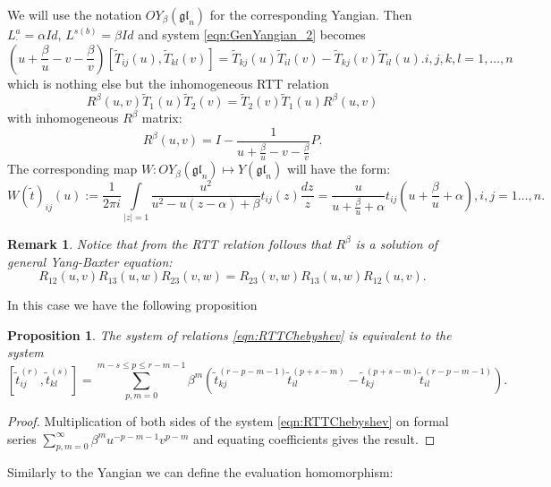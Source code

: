 \documentclass[10pt]{article}%
\numberwithin{equation}{section}
\newtheorem{prop}[thm]{Proposition}
\newtheorem{rem}[thm]{Remark}
\newcommand{\gl}{{\mathfrak{gl}}}
\begin{document}
We will use the notation $OY_{\beta}(\gl_n)$ for the corresponding Yangian.
Then $L_{\cdot}^{a}=\alpha Id$, $L^{s(b)}=\beta Id$ and system \eqref{eqn:GenYangian_2} becomes
\[
\left(u+\frac{\beta}{u}-v-\frac{\beta}{v}\right)[\tilde{T}_{ij}(u),\tilde{T}_{kl}(v)]=\tilde{T}_{kj}(u)\tilde{T}_{il}(v)-\tilde{T}_{kj}(v)\tilde{T}_{il}(u).i,j,k,l=1,\ldots,n
\]
which is nothing else but the inhomogeneous RTT relation 
\begin{equation}\label{eqn:RTTChebyshev}
R^{\beta}(u,v)\tilde{T}_1(u)\tilde{T}_2(v)=\tilde{T}_2(v)\tilde{T}_1(u)R^{\beta}(u,v)
\end{equation}
with inhomogeneous $R^{\beta}$ matrix:
\[
R^{\beta}(u,v)=I-\frac{1}{u+\frac{\beta}{u}-v-\frac{\beta}{v}}P.
\]
The corresponding map $W:OY_{\beta}(\gl_n)\mapsto Y(\gl_n) $  will have the form:
\begin{equation}\label{eqn:W_Cheb}
W(\tilde{t})_{ij}(u):=\frac{1}{2\pi i}\int\limits_{|z|=1} \frac{ u^2}{ u^2-u (z-\alpha) +\beta}t_{ij}(z)\frac{dz}{z}=\frac{u}{u+\frac{\beta}{u}+\alpha}t_{ij}(u+\frac{\beta}{u}+\alpha),i,j=1\ldots,n.
\end{equation}
\begin{rem}
Notice that from the RTT relation follows that $R^{\beta}$ is a solution of general Yang-Baxter equation:
\[
R_{12}(u,v)R_{13}(u,w)R_{23}(v,w)=R_{23}(v,w)R_{13}(u,w)R_{12}(u,v).
\]  
\end{rem}
In this case we have the following proposition
\begin{prop}\label{prop:CommutationRelations}
The system of relations \eqref{eqn:RTTChebyshev} is equivalent to the system
\[
[\tilde{t}_{ij}^{(r)},\tilde{t}^{(s)}_{kl}]=\sum\limits_{p,m=0}^{m-s\leq p\leq r-m-1}\beta^m\left(\tilde{t}^{(r-p-m-1)}_{kj}\tilde{t}^{(p+s-m)}_{il}-\tilde{t}^{(p+s-m)}_{kj}\tilde{t}^{(r-p-m-1)}_{il}\right).
\]
\end{prop}
\begin{proof}
Multiplication of both sides of the system \eqref{eqn:RTTChebyshev} on formal series
$\sum\limits_{p,m=0}^{\infty}\beta^m u^{-p-m-1}v^{p-m}$ and equating coefficients gives the result.
\end{proof}
Similarly to the Yangian we can define the evaluation homomorphism:
\end{document}
